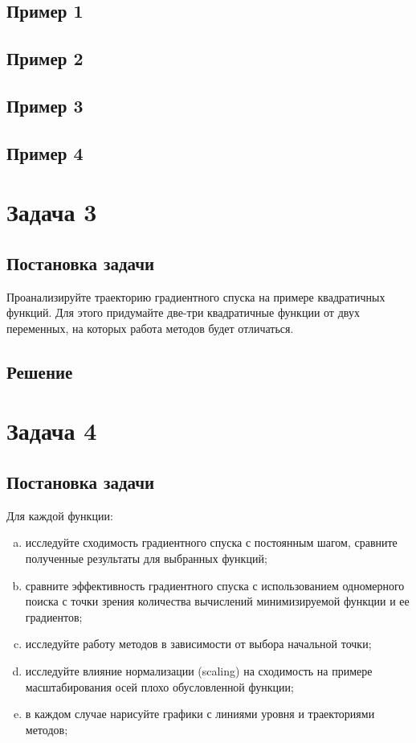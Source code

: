 \documentclass[12pt, a4paper, oneside]{article}
\begin{document}
	\subsection*{Пример 1}
	\subsection*{Пример 2}
	\subsection*{Пример 3}
	\subsection*{Пример 4}
	\section*{Задача 3}
	\subsection*{Постановка задачи}
	Проанализируйте траекторию градиентного спуска на примере квадратичных функций. Для этого придумайте две-три квадратичные функции от двух переменных, на которых работа методов будет отличаться.
	\subsection*{Решение}
	\section*{Задача 4}
	\subsection*{Постановка задачи}
	Для каждой функции:
	\begin{enumerate}[(a)]
		\item исследуйте сходимость градиентного спуска с постоянным шагом, сравните полученные результаты для выбранных функций;
		\item сравните эффективность градиентного спуска с использованием одномерного поиска с точки зрения количества вычислений минимизируемой функции и ее градиентов;
		\item исследуйте работу методов в зависимости от выбора начальной точки;
		\item исследуйте влияние нормализации (scaling) на сходимость на примере масштабирования осей плохо обусловленной функции;
		\item в каждом случае нарисуйте графики с линиями уровня и траекториями методов;
	\end{enumerate}
\end{document}
